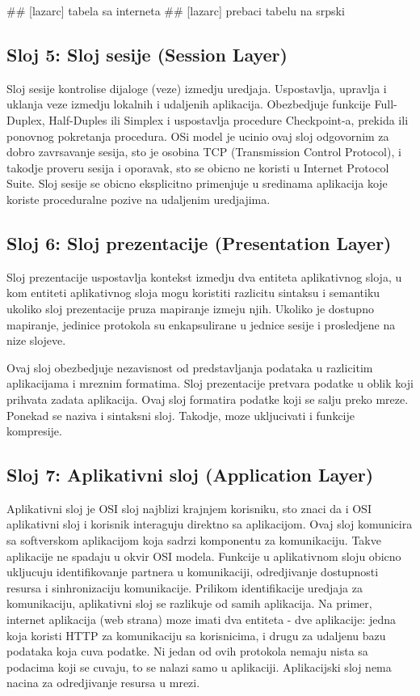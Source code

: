 \documentclass[a4paper,12pt, master]{etf}
\begin{document}
	\#\# [lazarc] tabela sa interneta
	\#\# [lazarc] prebaci tabelu na srpski

	\subsection{Sloj 5: Sloj sesije (Session Layer)}

	Sloj sesije kontrolise dijaloge (veze) izmedju uredjaja. Uspostavlja, upravlja i uklanja 
	veze izmedju lokalnih i udaljenih aplikacija. Obezbedjuje funkcije Full-Duplex, 
	Half-Duples ili	Simplex i uspostavlja procedure Checkpoint-a, prekida ili ponovnog 
	pokretanja procedura. OSi model je ucinio ovaj sloj odgovornim za dobro zavrsavanje sesija,
	sto je osobina TCP (Transmission Control Protocol), i takodje proveru sesija i oporavak, 
	sto se obicno ne koristi u Internet Protocol Suite. Sloj sesije se obicno eksplicitno 
	primenjuje u sredinama aplikacija koje koriste proceduralne pozive na udaljenim uredjajima.

	\subsection{Sloj 6: Sloj prezentacije (Presentation Layer)}

	Sloj prezentacije uspostavlja kontekst izmedju dva entiteta aplikativnog sloja, u kom 
	entiteti aplikativnog sloja mogu koristiti razlicitu sintaksu i semantiku ukoliko sloj 
	prezentacije pruza mapiranje izmeju njih. Ukoliko je dostupno mapiranje, jedinice 
	protokola su enkapsulirane u jednice sesije i prosledjene na nize slojeve.

	Ovaj sloj obezbedjuje nezavisnost od predstavljanja podataka u razlicitim aplikacijama i
	mreznim formatima. Sloj prezentacije pretvara podatke u oblik koji prihvata zadata 
	aplikacija.	Ovaj sloj formatira podatke koji se salju preko mreze. Ponekad se naziva i 
	sintaksni sloj.	Takodje, moze ukljucivati i funkcije kompresije.

	\subsection{Sloj 7: Aplikativni sloj (Application Layer)}

	Aplikativni sloj je OSI sloj najblizi krajnjem korisniku, sto znaci da i OSI aplikativni 
	sloj i korisnik interaguju direktno sa aplikacijom. Ovaj sloj komunicira sa softverskom 
	aplikacijom	koja sadrzi komponentu za komunikaciju. Takve aplikacije ne spadaju u okvir 
	OSI modela.	Funkcije u aplikativnom sloju obicno ukljucuju identifikovanje partnera u 
	komunikaciji, odredjivanje dostupnosti resursa i sinhronizaciju komunikacije. Prilikom 
	identifikacije uredjaja za komunikaciju, aplikativni sloj se razlikuje od samih 
	aplikacija. Na primer, internet aplikacija (web strana) moze imati dva entiteta - dve 
	aplikacije: jedna koja koristi HTTP za komunikaciju sa korisnicima, i drugu za udaljenu 
	bazu podataka koja cuva podatke. Ni jedan od ovih protokola nemaju nista sa podacima koji 
	se cuvaju, to se nalazi samo u aplikaciji. Aplikacijski sloj nema nacina za odredjivanje 
	resursa u mrezi.
\end{document}
